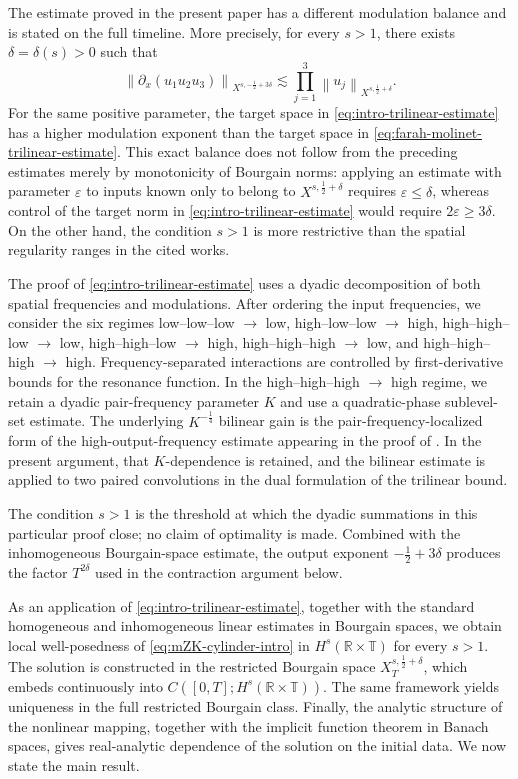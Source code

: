 \documentclass[12pt,oneside,reqno]{amsart}
\numberwithin{equation}{section}
\theoremstyle{plain}
\def\R{{\mathbb R}}
\def\T{{\mathbb T}}
\newcommand{\norm}[1]{%
    \left\lVert #1\right\rVert%
}
\begin{document}
The estimate proved in the present paper has a different modulation balance
and is stated on the full timeline. More precisely, for every $s>1$, there
exists $\delta=\delta(s)>0$ such that
\begin{equation}
\label{eq:intro-trilinear-estimate}
    \left\|
        \partial_x(u_1u_2u_3)
    \right\|_{X^{s,-\frac12+3\delta}}
    \lesssim
    \prod_{j=1}^{3}
    \norm{u_j}_{X^{s,\frac12+\delta}}.
\end{equation}
For the same positive parameter, the target space in
\eqref{eq:intro-trilinear-estimate} has a higher modulation exponent than the
target space in \eqref{eq:farah-molinet-trilinear-estimate}. This exact balance
does not follow from the preceding estimates merely by monotonicity of
Bourgain norms: applying an estimate with parameter $\varepsilon$ to inputs
known only to belong to $X^{s,\frac12+\delta}$ requires
$\varepsilon\leq\delta$, whereas control of the target norm in
\eqref{eq:intro-trilinear-estimate} would require
$2\varepsilon\geq3\delta$. On the other hand, the condition $s>1$ is more
restrictive than the spatial regularity ranges in the cited works.


The proof of \eqref{eq:intro-trilinear-estimate} uses a dyadic decomposition
of both spatial frequencies and modulations. After ordering the input
frequencies, we consider the six regimes low--low--low $\to$ low,
high--low--low $\to$ high, high--high--low $\to$ low,
high--high--low $\to$ high, high--high--high $\to$ low, and
high--high--high $\to$ high. Frequency-separated interactions are controlled
by first-derivative bounds for the resonance function. In the
high--high--high $\to$ high regime, we retain a dyadic pair-frequency
parameter $K$ and use a quadratic-phase sublevel-set estimate. The underlying
$K^{-\frac14}$ bilinear gain is the pair-frequency-localized form of the
high-output-frequency estimate appearing in the proof of
\cite[Proposition~3.1]{farah2024note}. In the present argument, that
$K$-dependence is retained, and the bilinear estimate is applied to two paired
convolutions in the dual formulation of the trilinear bound.

The condition $s>1$ is the threshold at which the dyadic summations in this
particular proof close; no claim of optimality is made. Combined with the
inhomogeneous Bourgain-space estimate, the output exponent
$-\frac12+3\delta$ produces the factor $T^{2\delta}$ used in the contraction
argument below.

As an application of \eqref{eq:intro-trilinear-estimate}, together with the
standard homogeneous and inhomogeneous linear estimates in Bourgain spaces,
we obtain local well-posedness of \eqref{eq:mZK-cylinder-intro} in
$H^s(\R\times\T)$ for every $s>1$. The solution is constructed in the
restricted Bourgain space $X_T^{s,\frac12+\delta}$, which embeds continuously
into $C([0,T];H^s(\R\times\T))$. The same framework yields uniqueness in the
full restricted Bourgain class. Finally, the analytic structure of the
nonlinear mapping, together with the implicit function theorem in Banach
spaces, gives real-analytic dependence of the solution on the initial data.
We now state the main result.
\end{document}
